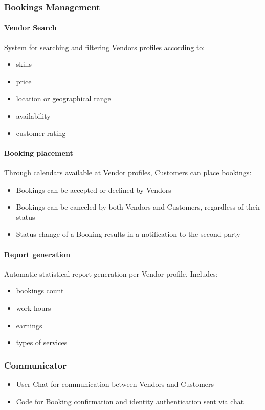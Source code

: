 \documentclass[11pt,a4paper]{article}
\begin{document}
\subsubsection{Bookings Management}

\paragraph{Vendor Search}

System for searching and filtering Vendors profiles according to:
\begin{itemize}
  \item skills
  \item price
  \item location or geographical range
  \item availability
  \item customer rating
\end{itemize}

\paragraph{Booking placement}

Through calendars available at Vendor profiles, Customers can place bookings:
\begin{itemize}
  \item Bookings can be accepted or declined by Vendors
  \item Bookings can be canceled by both Vendors and Customers,
    regardless of their status
  \item Status change of a Booking results in a notification to the second party
\end{itemize}

\paragraph{Report generation}

Automatic statistical report generation per Vendor profile. Includes:
\begin{itemize}
  \item bookings count
  \item work hours
  \item earnings
  \item types of services
\end{itemize}

\subsubsection{Communicator}
\begin{itemize}
  \item User Chat for communication between Vendors and Customers
  \item Code for Booking confirmation and identity authentication sent via chat
\end{itemize}
\end{document}
